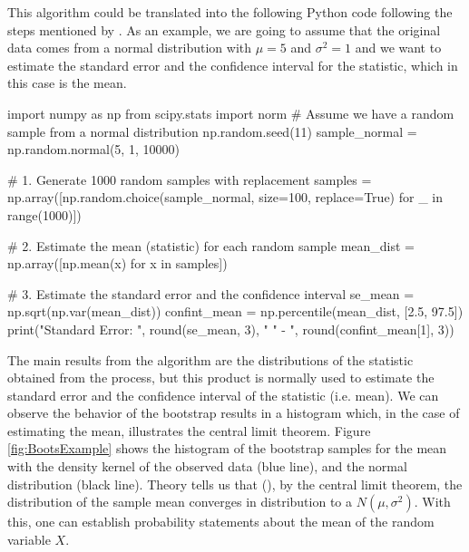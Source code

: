 \documentclass[11pt]{article}
\begin{document}
\medskip
\medskip

This algorithm could be translated into the following Python code following the steps mentioned by \cite{LW04}. As an
example, we are going to assume that the original data comes from a normal distribution with $\mu = 5$ and $\sigma^2 = 1$
and we want to estimate the standard error and the confidence interval for the statistic, which in this case is the mean.


\begin{pyblock}
import numpy as np
from scipy.stats import norm
# Assume we have a random sample from a normal distribution
np.random.seed(11)
sample_normal = np.random.normal(5, 1, 10000)

# 1. Generate 1000 random samples with replacement
samples = np.array([np.random.choice(sample_normal,
                    size=100, replace=True) for _ in range(1000)])

# 2. Estimate the mean (statistic) for each random sample
mean_dist = np.array([np.mean(x) for x in samples])

# 3. Estimate the standard error and the confidence interval
se_mean = np.sqrt(np.var(mean_dist))
confint_mean = np.percentile(mean_dist, [2.5, 97.5])
print("Standard Error: ",  round(se_mean, 3),
        "%
        " - ", round(confint_mean[1], 3))
\end{pyblock}

\printpythontex[verbatim]

\medskip

The main results from the algorithm are the distributions of the statistic obtained from the process, but this product is normally used to estimate the
standard error and the confidence interval of the statistic (i.e. mean).
We can observe the behavior of the bootstrap results in a histogram which, in the case of estimating the mean, illustrates the central
limit theorem. Figure \ref{fig:BootsExample} shows the histogram of the bootstrap samples for the mean with the density kernel of
the observed data (blue line), and the normal distribution (black line). Theory tells us that (\cite{LW04}), by the central limit theorem,
the distribution of the sample mean converges in distribution to a $N(\mu, \sigma^2)$. With this, one can establish
probability statements about the mean of the random variable $X$.
\end{document}
